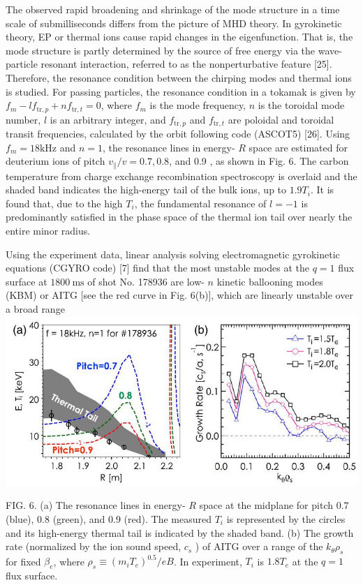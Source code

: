\documentclass[10pt]{article}
\begin{document}
The observed rapid broadening and shrinkage of the mode structure in a time scale of submilliseconds differs from the picture of MHD theory. In gyrokinetic theory, EP or thermal ions cause rapid changes in the eigenfunction. That is, the mode structure is partly determined by the source of free energy via the wave-particle resonant interaction, referred to as the nonperturbative feature [25]. Therefore, the resonance condition between the chirping modes and thermal ions is studied. For passing particles, the resonance condition in a tokamak is given by $f_{m}-l f_{\mathrm{tr}, p}+n f_{\mathrm{tr}, t}=0$, where $f_{m}$ is the mode frequency, $n$ is the toroidal mode number, $l$ is an arbitrary integer, and $f_{\mathrm{tr}, p}$ and $f_{\mathrm{tr}, t}$ are poloidal and toroidal transit frequencies, calculated by the orbit following code (ASCOT5) [26]. Using $f_{m}=18 \mathrm{kHz}$ and $n=1$, the resonance lines in energy- $R$ space are estimated for deuterium ions of pitch $v_{\|} / v=0.7,0.8$, and 0.9 , as shown in Fig. 6. The carbon temperature from charge exchange recombination spectroscopy is overlaid and the shaded band indicates the high-energy tail of the bulk ions, up to $1.9 T_{i}$. It is found that, due to the high $T_{i}$, the fundamental resonance of $l=-1$ is predominantly satisfied in the phase space of the thermal ion tail over nearly the entire minor radius.

Using the experiment data, linear analysis solving electromagnetic gyrokinetic equations (CGYRO code) [7] find that the most unstable modes at the $q=1$ flux surface at $1800 \mathrm{~ms}$ of shot No. 178936 are low- $n$ kinetic ballooning modes (KBM) or AITG [see the red curve in Fig. 6(b)], which are linearly unstable over a broad range
\includegraphics[max width=\textwidth, center]{2023_06_19_f8dbb752866ca158c73eg-5}

FIG. 6. (a) The resonance lines in energy- $R$ space at the midplane for pitch 0.7 (blue), 0.8 (green), and 0.9 (red). The measured $T_{i}$ is represented by the circles and its high-energy thermal tail is indicated by the shaded band. (b) The growth rate (normalized by the ion sound speed, $c_{s}$ ) of AITG over a range of the $k_{\theta} \rho_{s}$ for fixed $\beta_{e}$, where $\rho_{s} \equiv\left(m_{i} T_{e}\right)^{0.5} / e B$. In experiment, $T_{i}$ is $1.8 T_{e}$ at the $q=1$ flux surface.
\end{document}

